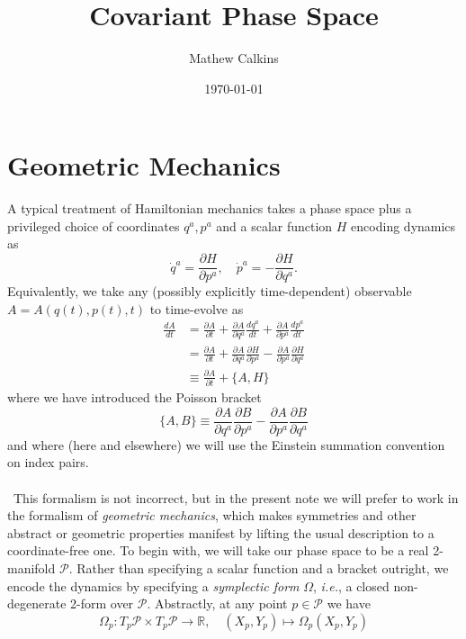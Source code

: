 \documentclass[11pt,letterpaper]{article}
\newcommand{\mc}[1]{\mathcal{#1}}
\newcommand{\R}{\mathbb{R}}
\newcommand{\PA}[2]{\frac{\partial #1}{\partial #2}}
\begin{document}
\title{Covariant Phase Space}

\author{Mathew Calkins}

\date{\today}

 
\maketitle


\tableofcontents

\section{Geometric Mechanics}
A typical treatment of Hamiltonian mechanics takes a phase space plus a privileged choice of coordinates $q^a, p^a$ and a scalar function $H$ encoding dynamics as \begin{equation}
\dot{q}^a = \PA{H}{p^a}, \quad \dot{p}^a = - \PA{H}{q^a}.
\end{equation}
Equivalently, we take any (possibly explicitly time-dependent) observable $A = A(q(t), p(t), t)$ to time-evolve as \begin{equation}
\begin{aligned}
\frac{dA}{dt} & = \PA{A}{t} + \PA{A}{q^a} \frac{dq^a}{dt} + \PA{A}{p^a} \frac{dp^a}{dt} \\
& = \PA{A}{t} + \PA{A}{q^a} \PA{H}{p^a} - \PA{A}{p^a} \PA{H}{q^a} \\
& \equiv \PA{A}{t} + \{ A, H \}
\end{aligned}
\end{equation}
where we have introduced the Poisson bracket \begin{equation}
\{A, B\} \equiv \PA{A}{q^a} \PA{B}{p^a} - \PA{A}{p^a} \PA{B}{q^a}
\end{equation}
and where (here and elsewhere) we will use the Einstein summation convention on index pairs. \\
\\
\
This formalism is not incorrect, but in the present note we will prefer to work in the formalism of \textit{geometric mechanics}, which makes symmetries and other abstract or geometric properties manifest by lifting the usual description to a coordinate-free one. To begin with, we will take our phase space to be a real 2-manifold $\mathcal{P}$. Rather than specifying a scalar function and a bracket outright, we encode the dynamics by specifying a \textit{symplectic form} $\Omega$, \textit{i.e.}, a closed non-degenerate 2-form over $\mc{P}$. Abstractly, at any point $p \in \mc{P}$ we have \begin{equation}
\Omega_p : T_p \mc{P} \times T_p \mc{P} \to \R, \quad (X_p, Y_p) \mapsto \Omega_p (X_p, Y_p)
\end{equation}
\end{document}

